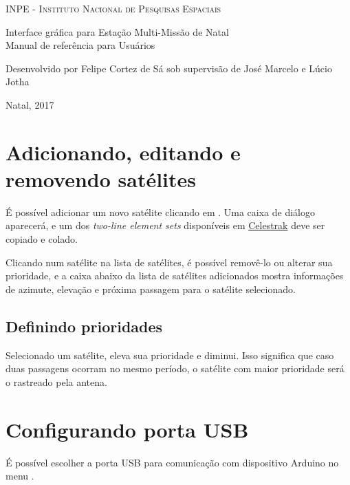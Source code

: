 \documentclass[12pt, a4paper]{article}
\begin{document}
\begin{titlepage}
\begin{center}
    \textsc{INPE - Instituto Nacional de Pesquisas Espaciais}

    \vfill

    Interface gráfica para Estação Multi-Missão de Natal \\
    Manual de referência para Usuários

    \vfill

    \begin{flushright}
    Desenvolvido por Felipe Cortez de Sá sob supervisão de José Marcelo e Lúcio Jotha
    \end{flushright}

    \vfill
    Natal, 2017
\end{center}
\end{titlepage}

\tableofcontents

\newpage

\section{Adicionando, editando e removendo satélites}
É possível adicionar um novo satélite clicando em . Uma caixa de diálogo aparecerá, e um dos \emph{two-line element
sets} disponíveis em \href{https://www.celestrak.com/NORAD/elements/resource.txt}{Celestrak}
deve ser copiado e colado.

Clicando num satélite na lista de satélites, é possível removê-lo ou alterar
sua prioridade, e a caixa abaixo da lista de satélites adicionados mostra
informações de azimute, elevação e próxima passagem para o satélite
selecionado.

\subsection{Definindo prioridades}
Selecionado um satélite, \menu{$ \blacktriangle $} eleva sua prioridade e
\menu{$ \blacktriangledown $} diminui. Isso significa que caso duas passagens
ocorram no mesmo período, o satélite com maior prioridade será o rastreado pela
antena.

\section{Configurando porta USB}
É possível escolher a porta USB para comunicação com dispositivo Arduino no
menu .
\end{document}
